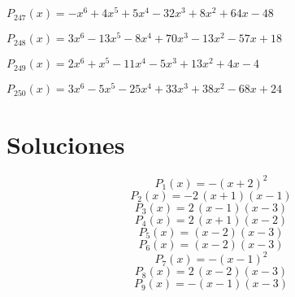 \subitem $P_{247}(x) = -x^6 + 4x^5 + 5x^4 - 32x^3 + 8x^2 + 64x - 48$

\subitem $P_{248}(x) = 3x^6 - 13x^5 - 8x^4 + 70x^3 - 13x^2 - 57x + 18$

\subitem $P_{249}(x) = 2x^6 + x^5 - 11x^4 - 5x^3 + 13x^2 + 4x - 4$

\subitem $P_{250}(x) = 3x^6 - 5x^5 - 25x^4 + 33x^3 + 38x^2 - 68x + 24$

\newpage\section{Soluciones}
\subitem \begin{dmath*}P_{1}(x) = -{\left(x + 2\right)}^{2} \end{dmath*}\vspace{-1.2cm}
\subitem \begin{dmath*}P_{2}(x) = -2 \, {\left(x + 1\right)} {\left(x - 1\right)} \end{dmath*}\vspace{-1.2cm}
\subitem \begin{dmath*}P_{3}(x) = 2 \, {\left(x - 1\right)} {\left(x - 3\right)} \end{dmath*}\vspace{-1.2cm}
\subitem \begin{dmath*}P_{4}(x) = 2 \, {\left(x + 1\right)} {\left(x - 2\right)} \end{dmath*}\vspace{-1.2cm}
\subitem \begin{dmath*}P_{5}(x) = {\left(x - 2\right)} {\left(x - 3\right)} \end{dmath*}\vspace{-1.2cm}
\subitem \begin{dmath*}P_{6}(x) = {\left(x - 2\right)} {\left(x - 3\right)} \end{dmath*}\vspace{-1.2cm}
\subitem \begin{dmath*}P_{7}(x) = -{\left(x - 1\right)}^{2} \end{dmath*}\vspace{-1.2cm}
\subitem \begin{dmath*}P_{8}(x) = 2 \, {\left(x - 2\right)} {\left(x - 3\right)} \end{dmath*}\vspace{-1.2cm}
\subitem \begin{dmath*}P_{9}(x) = -{\left(x - 1\right)} {\left(x - 3\right)} \end{dmath*}\vspace{-1.2cm}
